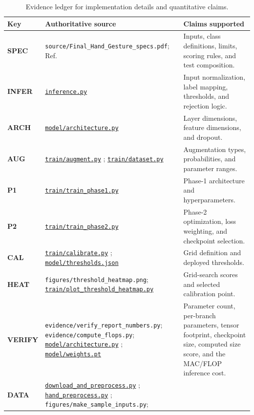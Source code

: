 \documentclass[10pt,twocolumn,a4paper]{article}
\newcommand{\ProjectRepository}{https://github.com/xxjustintwxx/Multimedia_Final_Project}
\newcommand{\codepath}[1]{%
  \href{\ProjectRepository/blob/main/#1}{\nolinkurl{#1}}%
}
\begin{document}
\begin{table}[t]
  \centering
  \caption{Evidence ledger for implementation details and quantitative claims.}
  \label{tab:evidence-ledger}
  \small
  \begin{tabular}{>{\bfseries}p{}p{}p{}}
    \toprule
    Key & Authoritative source & Claims supported \\
    \midrule
    \label{ev:SPEC}SPEC
      & \texttt{source/Final\_Hand\_Gesture\_specs.pdf}; Ref.~\cite{courseSpec}
      & Inputs, class definitions, limits, scoring rules, and test composition. \\
    \label{ev:INFER}INFER
      & \codepath{inference.py}
      & Input normalization, label mapping, thresholds, and rejection logic. \\
    \label{ev:ARCH}ARCH
      & \codepath{model/architecture.py}
      & Layer dimensions, feature dimensions, and dropout. \\
    \label{ev:AUG}AUG
      & \codepath{train/augment.py}; \codepath{train/dataset.py}
      & Augmentation types, probabilities, and parameter ranges. \\
    \label{ev:P1}P1
      & \codepath{train/train_phase1.py}
      & Phase-1 architecture and hyperparameters. \\
    \label{ev:P2}P2
      & \codepath{train/train_phase2.py}
      & Phase-2 optimization, loss weighting, and checkpoint selection. \\
    \label{ev:CAL}CAL
      & \codepath{train/calibrate.py}; \codepath{model/thresholds.json}
      & Grid definition and deployed thresholds. \\
    \label{ev:HEAT}HEAT
      & \texttt{figures/threshold\_heatmap.png};
        \codepath{train/plot_threshold_heatmap.py}
      & Grid-search scores and selected calibration point. \\
    \label{ev:VERIFY}VERIFY
      & \texttt{evidence/verify\_report\_numbers.py};
        \texttt{evidence/compute\_flops.py};
        \codepath{model/architecture.py}; \codepath{model/weights.pt}
      & Parameter count, per-branch parameters, tensor footprint, checkpoint
        size, computed size score, and the MAC/FLOP inference cost. \\
    \label{ev:DATA}DATA
      & \codepath{download_and_preprocess.py};
        \codepath{hand_preprocess.py};
        \texttt{figures/make\_sample\_inputs.py};

\end{tabular}
\end{table}
\end{document}
